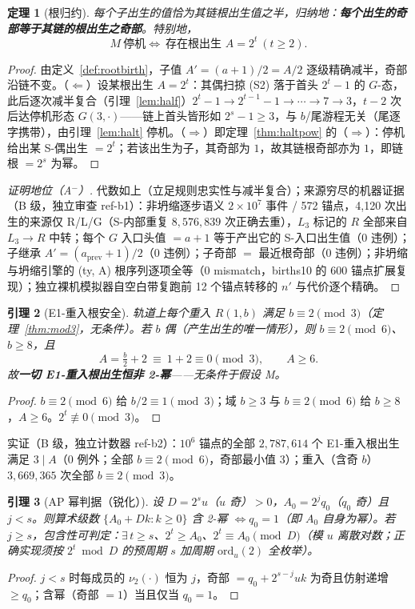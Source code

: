\documentclass[11pt]{ctexart}
\newtheorem{theorem}{定理}[section]
\newtheorem{lemma}[theorem]{引理}
\theoremstyle{definition}
\newcommand{\vtwo}[1]{\nu_2(#1)}
\begin{document}
\begin{theorem}[根归约]\label{thm:root}
每个子出生的值恰为其链根出生值之半，归纳地：\textbf{每个出生的奇部等于其链的根出生之奇部}。特别地，
\[
M\ \text{停机}\iff\ \text{存在根出生 } A=2^{t}\ (t\ge2).
\]
\end{theorem}
\begin{proof}
由定义~\ref{def:rootbirth}，子值 $A'=(a{+}1)/2=A/2$ 逐级精确减半，奇部沿链不变。（$\Leftarrow$）设某根出生 $A=2^t$：其偶扫掠 (S2) 落于首头 $2^t-1$ 的 $G$-态，此后逐次减半复合（引理~\ref{lem:half}）$2^t-1\to2^{t-1}-1\to\cdots\to7\to3$，$t-2$ 次后达停机形态 $G(3,\cdot)$——链上首头皆形如 $2^s-1\ge3$，与 $b$/尾游程无关（尾逐字携带），由引理~\ref{lem:halt} 停机。（$\Rightarrow$）即定理~\ref{thm:haltpow} 的（$\Rightarrow$）：停机给出某 S-偶出生 $=2^t$；若该出生为子，其奇部为 $1$，故其链根奇部亦为 $1$，即链根 $=2^s$ 为幂。
\end{proof}

\begin{proof}[证明地位（A$^-$）]
代数如上（立足规则忠实性与减半复合）；来源穷尽的机器证据（B 级，独立审查 ref-b1）：非坍缩逐步语义 $2\times10^7$ 事件 / 572 锚点，4,120 次出生的来源仅 R/L/G（S-内部重复 $8{,}576{,}839$ 次正确去重），$L_3$ 标记的 $R$ 全部来自 $L_3\to R$ 中转；每个 $G$ 入口头值 $=a{+}1$ 等于产出它的 S-入口出生值（0 违例）；子继承 $A'=(a_{\mathrm{prev}}{+}1)/2$（0 违例）；子奇部 $=$ 最近根奇部（0 违例）；非坍缩与坍缩引擎的 (ty, A) 根序列逐项全等（0 mismatch，births10 的 600 锚点扩展复现）；独立裸机模拟器自空白带复跑前 12 个锚点转移的 $n'$ 与代价逐个精确。
\end{proof}

\begin{lemma}[E1-重入根安全]\label{lem:e1}
轨道上每个重入 $R(1,b)$ 满足 $b\equiv2\pmod3$（定理~\ref{thm:mod3}，无条件）。若 $b$ 偶（产生出生的唯一情形），则 $b\equiv2\pmod6$、$b\ge8$，且
\[
A=\tfrac b2+2\ \equiv\ 1+2\equiv0\pmod3,\qquad A\ge6 .
\]
故\textbf{一切 E1-重入根出生恒非 2-幂}——无条件于假设 M。
\end{lemma}
\begin{proof}
$b\equiv2\pmod6$ 给 $b/2\equiv1\pmod3$；域 $b\ge3$ 与 $b\equiv2\pmod6$ 给 $b\ge8$，$A\ge6$。$2^t\not\equiv0\pmod3$。
\end{proof}
实证（B 级，独立计数器 ref-b2）：$10^6$ 锚点的全部 $2{,}787{,}614$ 个 E1-重入根出生满足 $3\mid A$（0 例外；全部 $b\equiv2\pmod6$，奇部最小值 $3$）；重入（含奇 $b$）$3{,}669{,}365$ 次全部 $b\equiv2\pmod3$。

\begin{lemma}[AP 幂判据（锐化）]\label{lem:ap}
设 $D=2^{s}u$（$u$ 奇）$>0$，$A_0=2^{j}q_0$（$q_0$ 奇）且 $j<s$。则算术级数 $\{A_0+Dk:k\ge0\}$ 含 2-幂 $\iff q_0=1$（即 $A_0$ 自身为幂）。若 $j\ge s$，包含性可判定：$\exists\,t\ge s$、$2^t\ge A_0$、$2^t\equiv A_0\pmod D$（模 $u$ 离散对数；正确实现须按 $2^t\bmod D$ 的预周期 $s$ 加周期 $\mathrm{ord}_u(2)$ 全枚举）。
\end{lemma}
\begin{proof}
$j<s$ 时每成员的 $\vtwo{\cdot}$ 恒为 $j$，奇部 $=q_0+2^{s-j}uk$ 为奇且仿射递增 $\ge q_0$；含幂（奇部 $=1$）当且仅当 $q_0=1$。
\end{proof}
\end{document}
